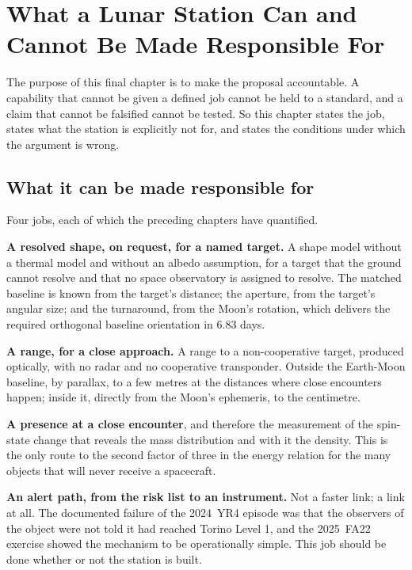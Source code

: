 
\chapter{What a Lunar Station Can and Cannot Be Made Responsible For}
\label{ch:close}

The purpose of this final chapter is to make the proposal accountable. A
capability that cannot be given a defined job cannot be held to a standard,
and a claim that cannot be falsified cannot be tested. So this chapter
states the job, states what the station is explicitly not for, and states
the conditions under which the argument is wrong.

\section{What it can be made responsible for}

Four jobs, each of which the preceding chapters have quantified.

\textbf{A resolved shape, on request, for a named target.} A shape model
without a thermal model and without an albedo assumption, for a target that
the ground cannot resolve and that no space observatory is assigned to
resolve. The matched baseline is known from the target's distance; the
aperture, from the target's angular size; and the turnaround, from the
Moon's rotation, which delivers the required orthogonal baseline orientation
in 6.83 days.

\textbf{A range, for a close approach.} A range to a non-cooperative target,
produced optically, with no radar and no cooperative transponder. Outside the
Earth-Moon baseline, by parallax, to a few metres at the distances where
close encounters happen; inside it, directly from the Moon's ephemeris, to
the centimetre.

\textbf{A presence at a close encounter}, and therefore the measurement of
the spin-state change that reveals the mass distribution and with it the
density. This is the only route to the second factor of three in the energy
relation for the many objects that will never receive a spacecraft.

\textbf{An alert path, from the risk list to an instrument.} Not a faster
link; a link at all. The documented failure of the 2024~YR4 episode was
that the observers of the object were not told it had reached Torino
Level 1, and the 2025~FA22 exercise showed the mechanism to be
operationally simple. This job should be done whether or not the station is
built.

